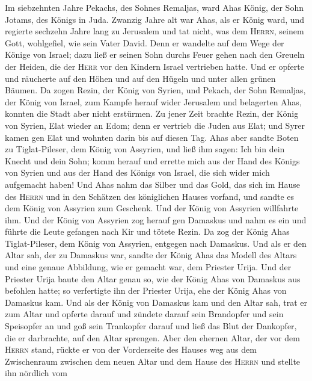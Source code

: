  Im siebzehnten Jahre Pekachs, des Sohnes Remaljas, ward
Ahas König, der Sohn Jotams, des Königs in Juda.  Zwanzig
Jahre alt war Ahas, als er König ward, und regierte sechzehn Jahre lang
zu Jerusalem und tat nicht, was dem \textsc{Herrn}, seinem Gott,
wohlgefiel, wie sein Vater David.  Denn er wandelte auf
dem Wege der Könige von Israel; dazu ließ er seinen Sohn durchs Feuer
gehen nach den Greueln der Heiden, die der \textsc{Herr} vor den Kindern
Israel vertrieben hatte.  Und er opferte und räucherte auf
den Höhen und auf den Hügeln und unter allen grünen Bäumen.
 Da zogen Rezin, der König von Syrien, und Pekach, der
Sohn Remaljas, der König von Israel, zum Kampfe herauf wider Jerusalem
und belagerten Ahas, konnten die Stadt aber nicht erstürmen.
 Zu jener Zeit brachte Rezin, der König von Syrien, Elat
wieder an Edom; denn er vertrieb die Juden aus Elat; und Syrer kamen gen
Elat und wohnten darin bis auf diesen Tag.  Ahas aber
sandte Boten zu Tiglat-Pileser, dem König von Assyrien, und ließ ihm
sagen: Ich bin dein Knecht und dein Sohn; komm herauf und errette mich
aus der Hand des Königs von Syrien und aus der Hand des Königs von
Israel, die sich wider mich aufgemacht haben!  Und Ahas
nahm das Silber und das Gold, das sich im Hause des \textsc{Herrn} und
in den Schätzen des königlichen Hauses vorfand, und sandte es dem König
von Assyrien zum Geschenk.  Und der König von Assyrien
willfahrte ihm. Und der König von Assyrien zog herauf gen Damaskus und
nahm es ein und führte die Leute gefangen nach Kir und tötete Rezin.
 Da zog der König Ahas Tiglat-Pileser, dem König von
Assyrien, entgegen nach Damaskus. Und als er den Altar sah, der zu
Damaskus war, sandte der König Ahas das Modell des Altars und eine
genaue Abbildung, wie er gemacht war, dem Priester Urija.
 Und der Priester Urija baute den Altar genau so, wie der
König Ahas von Damaskus aus befohlen hatte; so verfertigte ihn der
Priester Urija, ehe der König Ahas von Damaskus kam.  Und
als der König von Damaskus kam und den Altar sah, trat er zum Altar und
opferte darauf  und zündete darauf sein Brandopfer und
sein Speisopfer an und goß sein Trankopfer darauf und ließ das Blut der
Dankopfer, die er darbrachte, auf den Altar sprengen. 
Aber den ehernen Altar, der vor dem \textsc{Herrn} stand, rückte er von
der Vorderseite des Hauses weg aus dem Zwischenraum zwischen dem neuen
Altar und dem Hause des \textsc{Herrn} und stellte ihn nördlich vom
